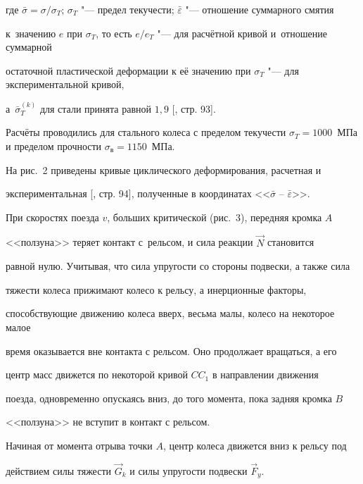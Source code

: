 где $\bar {\sigma }={\sigma }/{\sigma_T}$; $\sigma_T$ "--- предел текучести; $\bar {\varepsilon }$ "--- отношение суммарного смятия 

к~значению $e$ при $\sigma_T$, то есть ${e}/{e_T}$ "--- для расчётной кривой и~отношение суммарной 

остаточной пластической деформации к её значению при $\sigma_T$ "--- для экспериментальной кривой, 

а~$\bar {\sigma}_T^{(k)}$ для стали принята равной $1{,}9$ [, стр. 93].

Расчёты проводились для стального колеса с пределом текучести $\sigma_T

=1000$~МПа и пределом прочности $\sigma_{\text{в}} =1150$~МПа.









На рис.~2 приведены кривые циклического деформирования, расчетная и

экспериментальная [, стр. 94], полученные в координатах <<$\bar {\sigma }$ -- $\bar {\varepsilon }$>>.



При скоростях поезда $v$, больших критической (рис.~3), передняя кромка $A$

<<ползуна>> теряет контакт с~рельсом, и сила реакции $\vec {N}$ становится

равной нулю. Учитывая, что сила упругости со стороны подвески, а также сила

тяжести колеса прижимают колесо к рельсу, а инерционные факторы,

способствующие движению колеса вверх, весьма малы, колесо на некоторое малое

время оказывается вне контакта с рельсом. Оно продолжает вращаться, а его

центр масс движется по некоторой кривой $CC_1$ в направлении движения

поезда, одновременно опускаясь вниз, до того момента, пока задняя кромка $B$

<<ползуна>> не вступит в контакт с рельсом.





Начиная от момента отрыва точки $A$, центр колеса движется вниз к рельсу под

действием силы тяжести $\vec {G}_k$ и силы упругости подвески $\vec {F}_y$.

